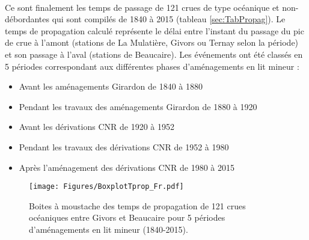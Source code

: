 \documentclass[11pt]{article}
\begin{document}
	\paragraph{} Ce sont finalement les temps de passage de 121 crues de type océanique et non-débordantes qui sont compilés de 1840 à 2015 (tableau \ref{sec:TabPropag}). Le temps de propagation calculé représente le délai entre l'instant du passage du pic de crue à l'amont (stations de La Mulatière, Givors ou Ternay selon la période) et son passage à l'aval (stations de Beaucaire). Les événements ont été classés en 5 périodes correspondant aux différentes phases d'aménagements en lit mineur : 
	\begin{itemize}
		\item Avant les aménagements Girardon de 1840 à 1880
		\item Pendant les travaux des aménagements Girardon de 1880 à 1920
		\item Avant les dérivations CNR de 1920 à 1952
		\item Pendant les travaux des dérivations CNR de 1952 à 1980
		\item Après l'aménagement des dérivations CNR de 1980 à 2015
	\end{itemize}

	\begin{figure}[h!]
		\centering
			\texttt{[image: Figures/BoxplotTprop\_Fr.pdf]}
	        \caption{Boites à moustache des temps de propagation de 121 crues océaniques entre Givors et Beaucaire pour 5 périodes d'aménagements en lit mineur (1840-2015).}
			\label{fig:BoxplotPropag}
		\end{figure}	
	\paragraph{}
\end{document}
